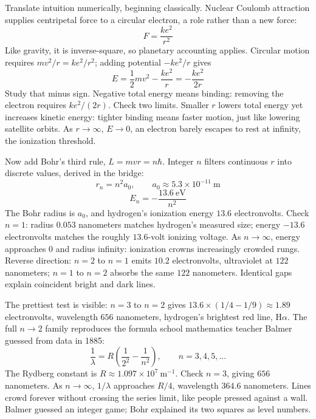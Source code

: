 \begin{mainline}
Translate intuition numerically, beginning classically. Nuclear Coulomb attraction supplies centripetal force to a circular electron, a role rather than a new force:
\[
F=\frac{ke^{2}}{r^{2}}
\]
Like gravity, it is inverse-square, so planetary accounting applies. Circular motion requires \(mv^{2}/r=ke^{2}/r^{2}\); adding potential \(-ke^{2}/r\) gives
\[
E=\frac{1}{2}mv^{2}-\frac{ke^{2}}{r}=-\frac{ke^{2}}{2r}
\]
Study that minus sign. Negative total energy means binding: removing the electron requires \(ke^{2}/(2r)\). Check two limits. Smaller \(r\) lowers total energy yet increases kinetic energy: tighter binding means faster motion, just like lowering satellite orbits. As \(r\to\infty\), \(E\to 0\), an electron barely escapes to rest at infinity, the ionization threshold.

Now add Bohr's third rule, \(L=mvr=n\hbar\). Integer \(n\) filters continuous \(r\) into discrete values, derived in the bridge:
\[
r_{n}=n^{2}a_{0},\qquad a_{0}\approx 5.3\times10^{-11}\ \mathrm{m}
\]
\[
E_{n}=-\frac{13.6\ \mathrm{eV}}{n^{2}}
\]
The Bohr radius is \(a_{0}\), and hydrogen's ionization energy \(13.6\) electronvolts. Check \(n=1\): radius \(0.053\) nanometers matches hydrogen's measured size; energy \(-13.6\) electronvolts matches the roughly \(13.6\)-volt ionizing voltage. As \(n\to\infty\), energy approaches \(0\) and radius infinity: ionization crowns increasingly crowded rungs. Reverse direction: \(n=2\) to \(n=1\) emits \(10.2\) electronvolts, ultraviolet at \(122\) nanometers; \(n=1\) to \(n=2\) absorbs the same \(122\) nanometers. Identical gaps explain coincident bright and dark lines.

The prettiest test is visible: \(n=3\) to \(n=2\) gives \(13.6\times(1/4-1/9)\approx1.89\) electronvolts, wavelength \(656\) nanometers, hydrogen's brightest red line, H\(\alpha\). The full \(n\to 2\) family reproduces the formula school mathematics teacher Balmer guessed from data in 1885:
\[
\frac{1}{\lambda}=R\left(\frac{1}{2^{2}}-\frac{1}{n^{2}}\right),\qquad n=3,4,5,\dots
\]
The Rydberg constant is \(R\approx1.097\times10^{7}\ \mathrm{m^{-1}}\). Check \(n=3\), giving \(656\) nanometers. As \(n\to\infty\), \(1/\lambda\) approaches \(R/4\), wavelength \(364.6\) nanometers. Lines crowd forever without crossing the series limit, like people pressed against a wall. Balmer guessed an integer game; Bohr explained its two squares as level numbers.
\end{mainline}

